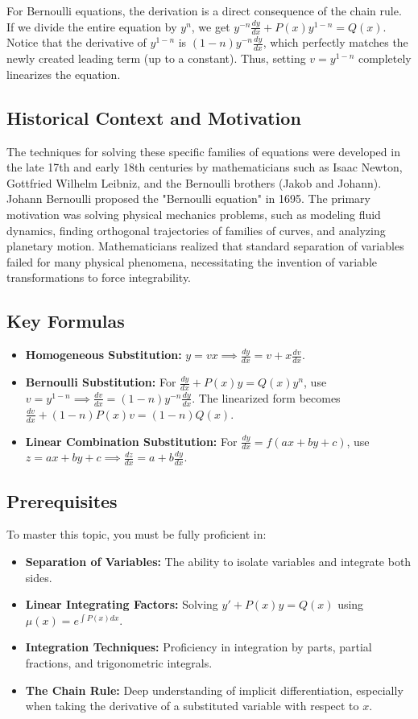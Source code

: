 \documentclass[11pt]{article}
\begin{document}
For Bernoulli equations, the derivation is a direct consequence of the chain rule. If we divide the entire equation by $y^n$, we get $y^{-n}\frac{dy}{dx} + P(x)y^{1-n} = Q(x)$. Notice that the derivative of $y^{1-n}$ is $(1-n)y^{-n}\frac{dy}{dx}$, which perfectly matches the newly created leading term (up to a constant). Thus, setting $v = y^{1-n}$ completely linearizes the equation.

\subsection{Historical Context and Motivation}
The techniques for solving these specific families of equations were developed in the late 17th and early 18th centuries by mathematicians such as Isaac Newton, Gottfried Wilhelm Leibniz, and the Bernoulli brothers (Jakob and Johann). Johann Bernoulli proposed the "Bernoulli equation" in 1695. The primary motivation was solving physical mechanics problems, such as modeling fluid dynamics, finding orthogonal trajectories of families of curves, and analyzing planetary motion. Mathematicians realized that standard separation of variables failed for many physical phenomena, necessitating the invention of variable transformations to force integrability.

\subsection{Key Formulas}
\begin{itemize}
    \item \textbf{Homogeneous Substitution:} $y = vx \implies \frac{dy}{dx} = v + x\frac{dv}{dx}$.
    \item \textbf{Bernoulli Substitution:} For $\frac{dy}{dx} + P(x)y = Q(x)y^n$, use $v = y^{1-n} \implies \frac{dv}{dx} = (1-n)y^{-n}\frac{dy}{dx}$. The linearized form becomes $\frac{dv}{dx} + (1-n)P(x)v = (1-n)Q(x)$.
    \item \textbf{Linear Combination Substitution:} For $\frac{dy}{dx} = f(ax+by+c)$, use $z = ax+by+c \implies \frac{dz}{dx} = a + b\frac{dy}{dx}$.
\end{itemize}

\subsection{Prerequisites}
To master this topic, you must be fully proficient in:
\begin{itemize}
    \item \textbf{Separation of Variables:} The ability to isolate variables and integrate both sides.
    \item \textbf{Linear Integrating Factors:} Solving $y' + P(x)y = Q(x)$ using $\mu(x) = e^{\int P(x)dx}$.
    \item \textbf{Integration Techniques:} Proficiency in integration by parts, partial fractions, and trigonometric integrals.
    \item \textbf{The Chain Rule:} Deep understanding of implicit differentiation, especially when taking the derivative of a substituted variable with respect to $x$.
\end{itemize}
\end{document}
